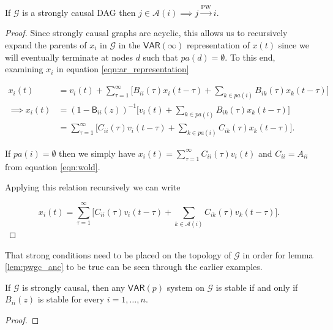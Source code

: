 \documentclass[12pt]{article}
\def\pwgc{\overset{\text{PW}}{\rightarrow}}  %
\def\gcg{\mathcal{G}}  %
\def\VAR{\mathsf{VAR}}  %
\def\B{\mathsf{B}}  %
\newcommand{\pa}[1]{pa(#1)}  %
\newcommand{\anc}[1]{\mathcal{A}(#1)}  %
\begin{document}
\begin{proposition}
  \label{lem:pwgc_anc}
  If $\gcg$ is a strongly causal DAG then $j \in \anc{i} \implies j \pwgc i$.
\end{proposition}
\begin{proof}
  Since strongly causal graphs are acyclic, this allows us to
  recursively expand the parents of $x_i$ in $\gcg$ in the
  $\VAR(\infty)$ representation of $x(t)$ since we will eventually
  terminate at nodes $d$ such that $\pa{d} = \emptyset$.  To this end,
  examining $x_i$ in equation \ref{eqn:ar_representation}

  \begin{align*}
    x_i(t) &= v_i(t) + \sum_{\tau = 1}^\infty \big[ B_{ii}(\tau)x_i(t - \tau) + \sum_{k \in \pa{i}} B_{ik}(\tau)x_k(t - \tau)\big]\\
    \implies x_i(t) &= (1 - \B_{ii}(z))^{-1} \big[v_i(t) + \sum_{k \in \pa{i}} B_{ik}(\tau)x_k(t - \tau) \big]\\
    &= \sum_{\tau = 1}^\infty \big[C_{ii}(\tau)v_i(t - \tau) + \sum_{k \in \pa{i}} C_{ik}(\tau)x_k(t - \tau)\big].
  \end{align*}

  If $\pa{i} = \emptyset$ then we simply have
  $x_i(t) = \sum_{\tau = 1}^\infty C_{ii}(\tau)v_i(t)$ and
  $C_{ii} = A_{ii}$ from equation \ref{eqn:wold}.

  Applying this relation recursively we can write

  \begin{equation*}
    x_i(t) = \sum_{\tau = 1}^\infty\big[C_{ii}(\tau)v_i(t - \tau) + \sum_{k \in \anc{i}}C_{ik}(\tau)v_k(t - \tau) \big].
  \end{equation*}

\end{proof}

That strong conditions need to be placed on the topology of $\gcg$ in
order for lemma \ref{lem:pwgc_anc} to be true can be seen through the
earlier examples.

\begin{lemma}
  If $\gcg$ is strongly causal, then any $\VAR(p)$ system on $\gcg$ is stable if and only if
  $B_{ii}(z)$ is stable for every $i = 1, \ldots, n$.
\end{lemma}
\begin{proof}
\end{proof}

\end{document}
